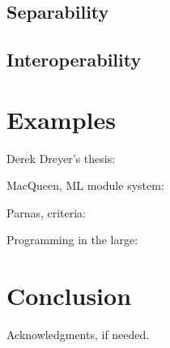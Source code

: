 \documentclass{sigplanconf}
\begin{document}
\subsection{Separability}

\subsection{Interoperability}

\section{Examples}

Derek Dreyer's thesis:
~\cite{dreyer2005understanding}

MacQueen, ML module system:
~\cite{macqueen1984modules}

Parnas, criteria:
~\cite{parnas1972criteria}

Programming in the large:
~\cite{deremer1976programming}

\section{Conclusion}


\acks

Acknowledgments, if needed.




\end{document}
